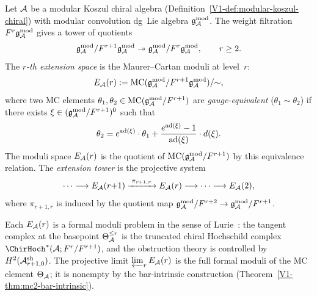 \begin{definition}
Let $\mathcal{A}$ be a modular Koszul chiral algebra
(Definition~\ref{V1-def:modular-koszul-chiral}) with
modular convolution dg~Lie algebra $\mathfrak{g}_{\mathcal{A}}^{\mathrm{mod}}$.
The weight filtration $F^r \mathfrak{g}_{\mathcal{A}}^{\mathrm{mod}}$ gives a tower
of quotients
\[
\mathfrak{g}_{\mathcal{A}}^{\mathrm{mod}} / F^{r+1} \mathfrak{g}_{\mathcal{A}}^{\mathrm{mod}}
\twoheadrightarrow
\mathfrak{g}_{\mathcal{A}}^{\mathrm{mod}} / F^r \mathfrak{g}_{\mathcal{A}}^{\mathrm{mod}},
\qquad r \geq 2.
\]
The \emph{$r$-th extension space} is the Maurer--Cartan
moduli at level~$r$:
\begin{equation}%
E_\cA(r) := \MC(\gAmod / F^{r+1} \gAmod)
/ {\sim},
\end{equation}
where two MC elements
$\theta_1, \theta_2 \in \mathrm{MC}(\mathfrak{g}_{\mathcal{A}}^{\mathrm{mod}} / F^{r+1})$ are
\emph{gauge-equivalent} ($\theta_1 \sim \theta_2$)
if there exists $\xi \in (\mathfrak{g}_{\mathcal{A}}^{\mathrm{mod}} / F^{r+1})^0$ such that
\begin{equation}%
\theta_2
= e^{\ad(\xi)} \cdot \theta_1
+ \frac{e^{\ad(\xi)} - 1}{\ad(\xi)} \cdot d(\xi).
\end{equation}
The moduli space $E_{\mathcal{A}}(r)$ is the quotient of
$\mathrm{MC}(\mathfrak{g}_{\mathcal{A}}^{\mathrm{mod}} / F^{r+1})$ by this equivalence relation.
The \emph{extension tower} is the projective system
\begin{equation}%
\cdots \longrightarrow
E_\cA(r{+}1) \xrightarrow{\;\pi_{r+1,r}\;}
E_\cA(r) \longrightarrow \cdots
\longrightarrow E_\cA(2),
\end{equation}
where $\pi_{r+1,r}$ is induced by the quotient map
$\mathfrak{g}_{\mathcal{A}}^{\mathrm{mod}} / F^{r+2} \to \mathfrak{g}_{\mathcal{A}}^{\mathrm{mod}} / F^{r+1}$.
\end{definition}

\begin{remark}
Each $E_{\mathcal{A}}(r)$ is a formal moduli problem in the sense
of Lurie~\cite{Lurie-DAG-X}:
the tangent complex at the basepoint
$\Theta_{\mathcal{A}}^{\leq r}$ is the truncated chiral Hochschild
complex $\ChirHoch^*(\cA; F^r/F^{r+1})$, and the
obstruction theory is controlled by
$H^2(\mathcal{A}^{\mathrm{sh}}_{r+1,0})$. The projective limit
$\varprojlim_r E_{\mathcal{A}}(r)$ is the full formal moduli
of the MC element $\Theta_{\mathcal{A}}$; it is nonempty by the
bar-intrinsic construction
(Theorem~\ref*{V1-thm:mc2-bar-intrinsic}).
\end{remark}


